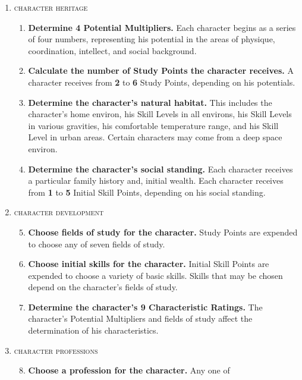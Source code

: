 \renewcommand{\theenumi}{\Alph{enumi}}
\renewcommand{\theenumii}{\arabic{enumii}}
\begin{enumerate}
\item \textsc{character heritage}
  \begin{enumerate}
  \item \textbf{Determine 4 Potential Multipliers.}  Each character
    begins as a series of four numbers, representing his potential in
    the areas of physique, coordination, intellect, and social
    background.
  \item \textbf{Calculate the number of Study Points the character
      receives.} A character receives from \textbf{2} to \textbf{6}
    Study Points, depending on his potentials.
  \item \textbf{Determine the character's natural habitat.} This
    includes the character's home environ, his Skill Levels in all
    environs, his Skill Levels in various gravities, his comfortable
    temperature range, and his Skill Level in urban areas. Certain
    characters may come from a deep space environ.
  \item \textbf{Determine the character's social standing.} Each
    character receives a particular family history and, initial
    wealth. Each character receives from \textbf{1} to \textbf{5}
    Initial Skill Points, depending on his social standing.
  \end{enumerate}
\item \textsc{character development}
  \begin{enumerate}
    \setcounter{enumii}{4}
  \item \textbf{Choose fields of study for the character.} Study
    Points are expended to choose any of seven fields of study.
  \item \textbf{Choose initial skills for the character.} Initial
    Skill Points are expended to choose a variety of basic skills.
    Skills that may be chosen depend on the character's fields of
    study.
  \item \textbf{Determine the character's 9 Characteristic Ratings.}
    The character's Potential Multipliers and fields of study affect
    the determination of his characteristics.
  \end{enumerate}
\item \textsc{character professions}
  \begin{enumerate}
    \setcounter{enumii}{7}
  \item \textbf{Choose a profession for the character.} Any one of 

\end{enumerate}
\end{enumerate}
